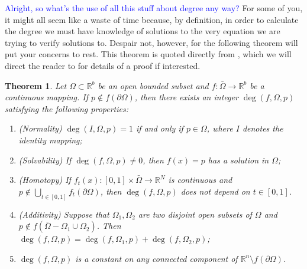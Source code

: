 \documentclass[11pt]{article}
\theoremstyle{plain}
\newtheorem{thm}{Theorem}[section]
\theoremstyle{definition}
\theoremstyle{remark}
\newcommand{\add}[1]{\textcolor{blue}{#1}}
\newcommand{\modified}[1]{\textcolor{darkgrn}{#1}}
\begin{document}
\add{Alright, so what's the use of all this stuff about degree any way?} For some of you, it might all seem like a waste of time because, by definition, in order to calculate the degree we must have knowledge of solutions to the very equation we are trying to verify solutions to. \modified{Despair not, however,} for the following theorem will put your concerns to rest. 
This theorem is quoted directly from \cite{OrChCh2006}, which we will direct the reader to for details of a proof if interested. 

\begin{thm} \label{DegThm}
Let $\Omega\subset\mathbb{R}^b$ be an open bounded subset and $f:\bar{\Omega}\rightarrow\mathbb{R}^b$ be a continuous mapping. If $p\not\in f\left(\partial\Omega\right)$, then there exists an integer $\operatorname{deg}\left(f, \Omega,p\right)$ satisfying the following properties:
\begin{enumerate}
\item (Normality) $\operatorname{deg}\left(I, \Omega,p\right)=1$ if and only if $p\in\Omega$, where $I$ denotes the identity mapping;
\item (Solvability) If $\operatorname{deg}\left(f, \Omega,p\right)\not= 0$, then $f(x)=p$ has a solution in $\Omega$;
\item (Homotopy) If $f_t(x):[0,1]\times\bar{\Omega}\rightarrow\mathbb{R}^N$ is continuous and $p\not\in \bigcup\limits_{t\in[0,1]}f_t\left(\partial\Omega\right)$, then $\operatorname{deg}\left(f, \Omega,p\right)$ does not depend on $t\in[0,1]$. 
\item (Additivity) Suppose that $\Omega_1, \Omega_2$ are two disjoint open subsets of $\Omega$ and $p\not\in f\left(\bar{\Omega}-\Omega_1\cup\Omega_2\right)$. Then $\operatorname{deg}\left(f, \Omega,p\right)=\operatorname{deg}\left(f, \Omega_1,p\right)+\operatorname{deg}\left(f, \Omega_2,p\right)$;
\item $\operatorname{deg}\left(f, \Omega,p\right)$ is a constant on any connected component of $\mathbb{R}^n\setminus f(\partial\Omega)$. 
\end{enumerate}
\end{thm}
\end{document}
